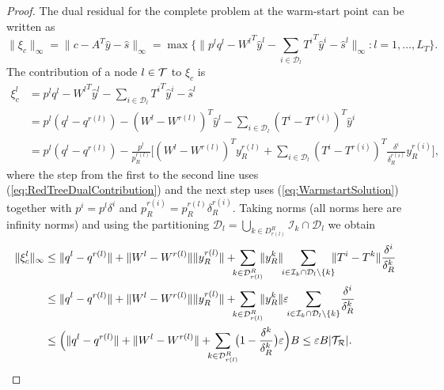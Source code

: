 \begin{proof}
The dual residual for the complete problem at the warm-start point 
can be written as
\[
  \|\xi_c\|_\infty = \|c -A^T\hat y -\hat s \|_\infty 
                   = \max\{\|p^{l}q^{l}
                   - {W^{l}}^T\hat y^{l} 
                   - \sum_{i \in \mathcal{D}_{l}} {T^{i}}^T\hat y^{i}
                   - \hat s^{l}
  \|_\infty : l = 1,\ldots,L_T\}.
\]
%
The contribution of a node $l \in \mathcal{T}$ to $\xi_c$ is
\[
\begin{split}
  \xi_c^{l} 
 & = p^{l} q^{l} - {W^{l}}^T\hat y^{l}
     - \sum_{i\in \mathcal{D}_{l}} {T^i}^T \!\hat y^{i} -\hat s^{l} \\
 & = p^{l}(q^{l}\!-\! q^{r(l)})
     - (W^{l} \!-\! W^{r(l)})^T \hat y^{l}
     -\sum_{i \in \mathcal{D}_{l}} (T^{i} \!-\! T^{r(i)})^T\hat y^i \\
 & = p^{l}(q^{l} \!-\! q^{r(l)})
     - \frac{p^{l}}{p^{r(l)}_R} \Big[
       (W^{l} \!-\! W^{r(l)})^T y^{r(l)}_R
       +\sum_{i\in \mathcal{D}_{l}} %
           (T^{i} \!-\! T^{r(i)})^T 
           \frac{\delta^i}{\delta^{r(i)}_R} y^{r(i)}_R \Big],
\end{split}
\]
where the step from the first to the second line uses 
(\ref{eq:RedTreeDualContribution}) and the next step uses
(\ref{eq:WarmstartSolution}) together with $p^i = p^l\delta^i$ and
$p_R^{r(i)} = p_R^{r(l)}\delta_R^{r(i)}$.
%
Taking norms (all norms here are infinity norms)
and using the partitioning 
$\mathcal{D}_l = \bigcup_{k\in D^R_{r(l)}} \mathcal{I}_k\cap\mathcal{D}_l$
we obtain
\[
\begin{split}
  \| \xi_c^{l} \|_\infty
  & \le \|q^{l} - q^{r(l)}\| 
        + \|W^{l} - W^{r(l)}\| \| y^{r(l)}_R\|
        + \!\!\! \sum_{k\in \mathcal{D}_{r(l)}^R} \!\!\! \| y^{k}_R \| \!\!
          \sum_{i\in \mathcal{I}_k \cap \mathcal{D}_{l}\setminus \{k\} }
	  \!\!\! \| T^{i} - T^{k} \| \frac{\delta^i}{\delta_R^k} \\
  & \le \|q^{l} - q^{r(l)}\| 
        + \|W^{l} - W^{r(l)}\| \| y^{r(l)}_R\|
        + \!\!\! \sum_{k\in \mathcal{D}_{r(l)}^R} \!\!\! \| y^{k}_R \|
          \varepsilon \!\!
          \sum_{i\in \mathcal{I}_k \cap \mathcal{D}_{l}\setminus \{k\} }
	  \! \frac{\delta^i}{\delta_R^k} \\
  & \le \Big( \|q^{l} - q^{r(l)}\| 
        + \|W^{l} - W^{r(l)}\|
        + \!\!\! \sum_{k\in \mathcal{D}_{r(l)}^R} \!\!\!
	  \big( 1 - \frac{\delta^k}{\delta_R^k} \big) \varepsilon \Big) B
    \le \varepsilon B |\Rtree|.
        \qedhere
\end{split}
\]
%
\end{proof}

